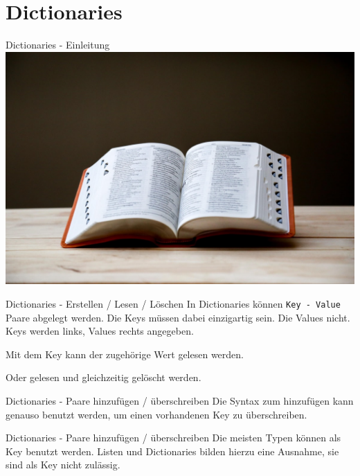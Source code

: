 \section{Dictionaries}
\begin{frame}{Dictionaries - Einleitung}
	\includegraphics[width=\linewidth]{resources/03bool_fun_dict/lexikon.jpeg}
\end{frame}

\begin{frame}{Dictionaries - Erstellen / Lesen / Löschen}
	In Dictionaries können \alert{\texttt{Key - Value}} Paare abgelegt werden.
	\linebreak
	Die Keys müssen dabei einzigartig sein. Die Values nicht.
	\linebreak
	Keys werden links, Values rechts angegeben.
	
	
	Mit dem Key kann der zugehörige Wert gelesen werden.
	
	
	Oder gelesen und gleichzeitig gelöscht werden.
	
	
\end{frame}

\begin{frame}{Dictionaries - Paare hinzufügen / überschreiben}
	Die Syntax zum hinzufügen kann genauso benutzt werden, um einen vorhandenen Key zu überschreiben.
	
	
\end{frame}

\begin{frame}{Dictionaries - Paare hinzufügen / überschreiben}
	Die meisten Typen können als Key benutzt werden. Listen und Dictionaries bilden hierzu eine Ausnahme, sie sind als Key nicht zulässig.
	
\end{frame}


